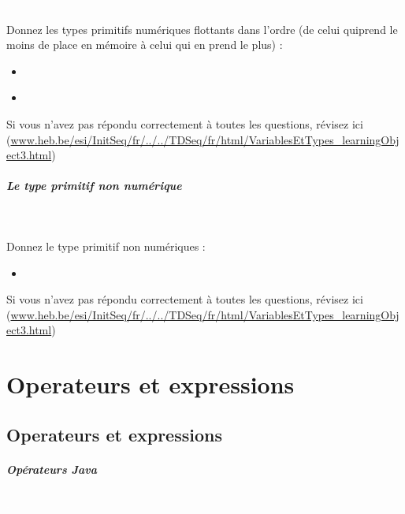 \documentclass[11pt,a4paper]{article}
\begin{document}
                \textcolor{white}{.} \par
             
								Donnez les types primitifs num\'eriques flottants dans l'ordre (de celui quiprend le moins de place en m\'emoire \`a celui qui en prend le plus) :
							
					\begin{itemize}
				
			\item  \textcolor{gray}{\underline{\hspace*{3em}}} 
			\item  \textcolor{gray}{\underline{\hspace*{5em}}} 
					\end{itemize}
				Si vous n'avez pas r\'epondu correctement \`a toutes les questions, 
				    r\'evisez ici (\url{www.heb.be/esi/InitSeq/fr/../../TDSeq/fr/html/VariablesEtTypes\_learningObject3.html})
            \par
        
			
		\subparagraph{Le type primitif non num\'erique} 
		
                \textcolor{white}{.} \par
             
								Donnez le type primitif non num\'eriques :
							
					\begin{itemize}
				
			\item  \textcolor{gray}{\underline{\hspace*{5em}}} 
					\end{itemize}
				Si vous n'avez pas r\'epondu correctement \`a toutes les questions, 
          r\'evisez ici (\url{www.heb.be/esi/InitSeq/fr/../../TDSeq/fr/html/VariablesEtTypes\_learningObject3.html})
            \par
        \section{Operateurs et expressions}\subsection{Operateurs et expressions}
			
		\subparagraph{Op\'erateurs Java} 
		
                \textcolor{white}{.} \par
            
\end{document}
